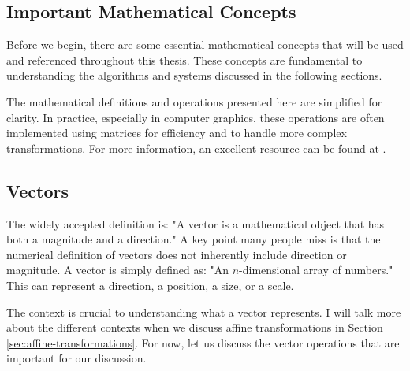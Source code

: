 \subsection{Important Mathematical Concepts}
\label{sec:important-mathematical-concepts}

Before we begin, there are some essential mathematical concepts that will be used and referenced throughout this thesis. These concepts are fundamental to understanding the algorithms and systems discussed in the following sections.

\begin{Note}
    The mathematical definitions and operations presented here are simplified for clarity. In practice, especially in computer graphics, these operations are often implemented using matrices for efficiency and to handle more complex transformations. For more information, an excellent resource can be found at \cite{learn-opengl}.
\end{Note}

\subsection{Vectors}
\label{sec:vectors}

The widely accepted definition is: "A vector is a mathematical object that has both a magnitude and a direction." A key point many people miss is that the numerical definition of vectors does not inherently include direction or magnitude. A vector is simply defined as: "An \(n\)-dimensional array of numbers." This can represent a direction, a position, a size, or a scale.

The context is crucial to understanding what a vector represents. I will talk more about the different contexts when we discuss affine transformations in Section \ref{sec:affine-transformations}. For now, let us discuss the vector operations that are important for our discussion.

